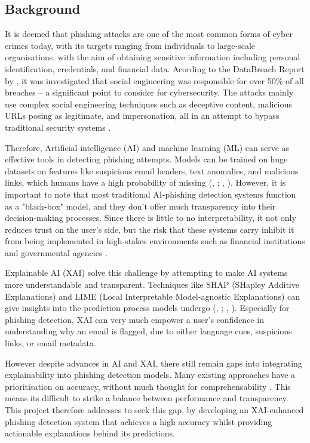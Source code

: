 \subsection*{Background}

It is deemed that phishing attacks are one of the most common forms of cyber crimes today, with its targets ranging from individuals to large-scale organisations, with the aim of obtaining sensitive information including personal identification, credentials, and financial data. Acording to the DataBreach Report by \cite{verizon2023}, it was investigated that social engineering was responsible for over 50\% of all breaches -- a significant point to consider for cybersecurity. The attacks mainly use complex social engineering techniques such as deceptive content, malicious URLs posing as legitimate, and impersonation, all in an attempt to bypass traditional security systems \citep{marett2009effectiveness}. \newline

\noindent Therefore, Artificial intelligence (AI) and machine learning (ML) can serve as effective tools in detecting phishing attempts. Models can be trained on huge datasets on features like suspicious email headers, text anomalies, and malicious links, which humans have a high probability of missing (\citeauthor{chandrasekaran2006phoney}, \citeyear{chandrasekaran2006phoney}; \citeauthor{jain2022survey}, \citeyear{jain2022survey}). However, it is important to note that most traditional AI-phishing detection systems function as a "black-box" model, and they don't offer much transparency into their decision-making processes. Since there is little to no interpretability, it not only reduces trust on the user's side, but the risk that these systems carry inhibit it from being implemented in high-stakes environments such as financial institutions and governmental agencies \citep{ribeiro2016model}. \newline

\noindent Explainable AI (XAI) solve this challenge by attempting to make AI systems more understandable and transparent. Techniques like SHAP (SHapley Additive Explanations) and LIME (Local Interpretable Model-agnostic Explanations) can give insights into the prediction process models undergo (\citeauthor{lundberg2017unified}, \citeyear{lundberg2017unified}; \citeauthor{ribeiro2016model}, \citeyear{ribeiro2016model}). Especially for phishing detection, XAI can very much empower a user's confidence in understanding why an email is flagged, due to either language cues, suspicious links, or email metadata. \newline

\noindent However despite advances in AI and XAI, there still remain gaps into integrating explainability into phishing detection models. Many existing approaches have a prioritisation on accuracy, without much thought for comprehensability \citep{hernandes2021phishing}. This means its difficult to strike a balance between performance and transparency. This project therefore addresses to seek this gap, by developing an XAI-enhanced phishing detection system that achieves a high accuracy whilst providing actionable explanations behind its predictions.
